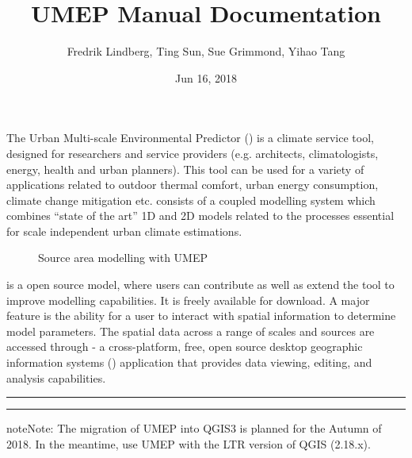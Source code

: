 \documentclass[letterpaper,10pt,english]{sphinxmanual}
\title{UMEP Manual Documentation}
\date{Jun 16, 2018}
\author{Fredrik Lindberg, Ting Sun, Sue Grimmond, Yihao Tang}
\begin{document}
\maketitle
\sphinxtableofcontents
{}\label{\detokenize{index::doc}}


The Urban Multi-scale Environmental Predictor () is a climate
service tool, designed for researchers and service providers (e.g.
architects, climatologists, energy, health and urban planners). This
tool can be used for a variety of applications related to outdoor
thermal comfort, urban energy consumption, climate change mitigation
etc.  consists of a coupled modelling system which combines
“state of the art” 1D and 2D models related to the processes essential
for scale independent urban climate estimations.
\begin{wrapfigure}{r}{0pt}
\centering
\noindent{}
\caption{Source area modelling with UMEP}\label{\detokenize{index:id1}}\end{wrapfigure}

 is a open source model, where users can contribute as well as extend the tool
to improve modelling capabilities. It is freely available for download.
A major feature is the ability for a user to interact with spatial
information to determine model parameters. The spatial data across a
range of scales and sources are accessed through
 - a cross-platform, free, open source
desktop geographic information systems
({\hyperref[\detokenize{Abbreviations::doc}]{}}) application \textendash{}
that provides data viewing, editing, and analysis capabilities.


\bigskip\hrule\bigskip


  {\hyperref[\detokenize{Getting_Started:getting-started}]{}}


\bigskip\hrule\bigskip


\begin{sphinxadmonition}{note}{Note:}
The migration of UMEP into QGIS3 is planned for the Autumn of 2018. In the meantime, use UMEP with the LTR version of QGIS (2.18.x).
\end{sphinxadmonition}
\end{document}

